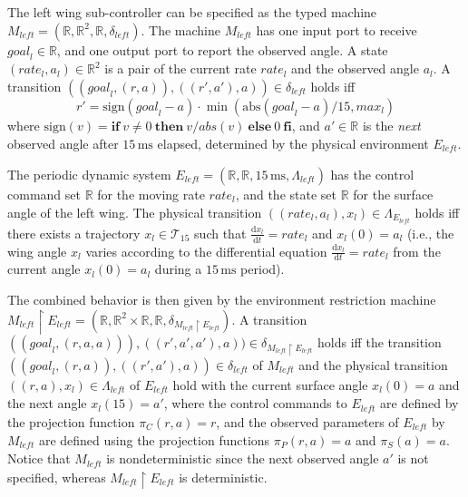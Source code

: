 \documentclass{sig-alternate}
\newcommand{\ite}[3]{\mathbf{if}\ #1\ \mathbf{then}\ #2\ \mathbf{else}\ #3\ \mathbf{fi}}
\newcommand{\abs}{\ensuremath{\mathrm{abs}}}
\newcommand{\sign}{\ensuremath{\mathrm{sign}}}
\begin{document}
The left wing sub-controller  can be specified 
as the typed machine 
$M_\mathit{left} = (\mathbb{R}, \mathbb{R}^2, \mathbb{R}, \delta_{\mathit{left}})$.
The machine $M_\mathit{left}$ has one input port to receive $\mathit{goal}_l \in \mathbb{R}$,
and one output port to report the observed angle. %
A state $(\mathit{rate}_l, a_l) \in \mathbb{R}^2$ is a pair of the current rate $\mathit{rate}_l$ and the observed angle $a_l$.
A transition $((\mathit{goal}_l, (r, a)), ((r', a'),a)) \in  \delta_{\mathit{left}}$
holds iff 
\[
r' = \sign(\mathit{goal}_l - a) \cdot \min(\abs(\mathit{goal}_l - a) / 15, \mathit{max}_l)
\]
where $\sign(v) = \ite{v \neq 0}{v / abs(v)}{0}$, and
$a' \in \mathbb{R}$ is the \emph{next}  observed angle after $15\,\mathrm{ms}$ elapsed,
determined by the physical environment $E_\mathit{left}$.

The periodic dynamic system 
$E_\mathit{left} = (\mathbb{R}, \mathbb{R}, 15\,\mathrm{ms}, \Lambda_\mathit{left})$
has the control command set $\mathbb{R}$ for the moving rate $\mathit{rate}_l$,
and the state set $\mathbb{R}$ for the surface angle of the left wing.
The physical transition 
$( (\mathit{rate}_l, a_l), x_l ) \in \Lambda_{E_\mathit{left}}$ holds
iff there exists a trajectory $x_l \in \mathcal{T}_{15}$ such that
$\frac{\mathrm{d} x_l}{\mathrm{d}t} = \mathit{rate}_l$ and $x_l(0) = a_l$
(i.e., the wing angle  $x_l$ varies 
according to the differential 
equation $\frac{\mathrm{d} x_l}{\mathrm{d}t} = \mathit{rate}_l$
from the current angle $x_l(0) = a_l$
during a $15\,\mathrm{ms}$ period).

The combined behavior is then given by the environment restriction machine
$M_\mathit{left} \restriction E_\mathit{left} = (\mathbb{R}, \mathbb{R}^2 \times \mathbb{R}, \mathbb{R}, \delta_{M_\mathit{left} \restriction E_\mathit{left}})$.
A transition 
$((\mathit{goal}_l, (r, a, a))), ((r',a', a'), a) ) 
\in \delta_{M_\mathit{left} \restriction E_\mathit{left}}$ 
holds iff
the transition $( (\mathit{goal}_l, (r,a)), ((r',a'),a) ) \in \delta_{\mathit{left}}$
of $M_\mathit{left}$
and the physical transition 
$((r, a), x_l) \in \Lambda_{\mathit{left}}$ of $E_\mathit{left}$ hold
with the current surface angle $x_l(0) = a$ and the next angle $x_l(15) = a'$,
where the control commands to $E_\mathit{left}$ are defined by the projection function $\pi_C(r,a) = r$,
and the observed parameters of $E_\mathit{left}$ by $M_\mathit{left}$
are defined using the projection functions $\pi_P(r,a) = a$ and $\pi_S(a) = a$.
%
Notice that $M_\mathit{left}$ is nondeterministic
since the next observed angle $a'$ is not specified,
whereas
$M_\mathit{left} \restriction E_\mathit{left}$ is deterministic.
\end{document}
